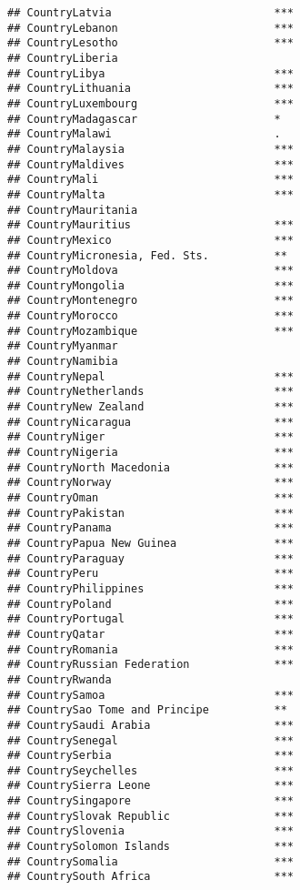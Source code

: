 \documentclass[
]{article}
\begin{document}
\begin{verbatim}
## CountryLatvia                         ***
## CountryLebanon                        ***
## CountryLesotho                        ***
## CountryLiberia                           
## CountryLibya                          ***
## CountryLithuania                      ***
## CountryLuxembourg                     ***
## CountryMadagascar                     *  
## CountryMalawi                         .  
## CountryMalaysia                       ***
## CountryMaldives                       ***
## CountryMali                           ***
## CountryMalta                          ***
## CountryMauritania                        
## CountryMauritius                      ***
## CountryMexico                         ***
## CountryMicronesia, Fed. Sts.          ** 
## CountryMoldova                        ***
## CountryMongolia                       ***
## CountryMontenegro                     ***
## CountryMorocco                        ***
## CountryMozambique                     ***
## CountryMyanmar                           
## CountryNamibia                           
## CountryNepal                          ***
## CountryNetherlands                    ***
## CountryNew Zealand                    ***
## CountryNicaragua                      ***
## CountryNiger                          ***
## CountryNigeria                        ***
## CountryNorth Macedonia                ***
## CountryNorway                         ***
## CountryOman                           ***
## CountryPakistan                       ***
## CountryPanama                         ***
## CountryPapua New Guinea               ***
## CountryParaguay                       ***
## CountryPeru                           ***
## CountryPhilippines                    ***
## CountryPoland                         ***
## CountryPortugal                       ***
## CountryQatar                          ***
## CountryRomania                        ***
## CountryRussian Federation             ***
## CountryRwanda                            
## CountrySamoa                          ***
## CountrySao Tome and Principe          ** 
## CountrySaudi Arabia                   ***
## CountrySenegal                        ***
## CountrySerbia                         ***
## CountrySeychelles                     ***
## CountrySierra Leone                   ***
## CountrySingapore                      ***
## CountrySlovak Republic                ***
## CountrySlovenia                       ***
## CountrySolomon Islands                ***
## CountrySomalia                        ***
## CountrySouth Africa                   ***

\end{verbatim}
\end{document}
